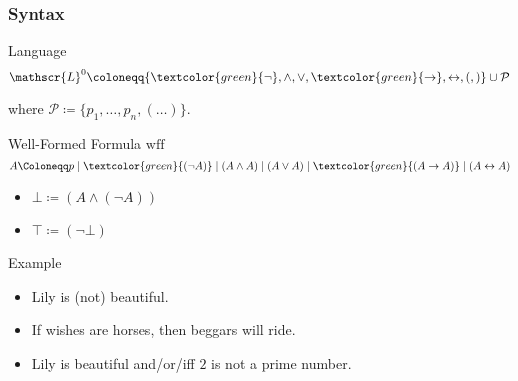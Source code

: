 \documentclass[UTF8,11pt,colorlinks,compress,openany]{beamer}%
\begin{document}
\begin{frame}\frametitle{Syntax}
		\begin{block}{Language}
			\[\mathscr{L}^0\coloneqq \{\textcolor{green}{\neg},\wedge,\vee,\textcolor{green}{\to},\leftrightarrow,(,)\}\cup\mathcal{P}\]
		\end{block}
		where $\mathcal{P}\coloneqq \{p_1,\dots,p_n,(\dots)\}$.
		\begin{block}{Well-Formed Formula $\mathrm{wff}$}
			\[A\Coloneqq p\mid \textcolor{green}{(\neg A)}\mid (A\wedge A)\mid (A\vee A)\mid \textcolor{green}{(A\to A)}\mid (A\leftrightarrow A)\]
		\end{block}
		\begin{itemize}
			\item $\bot\coloneqq (A\wedge(\neg A))$
			\item $\top\coloneqq (\neg\bot)$
		\end{itemize}
		\begin{block}{Example}
			\begin{itemize}
				\item Lily is (not) beautiful.
				\item If wishes are horses, then beggars will ride.
				\item Lily is beautiful and/or/iff $2$ is not a prime number.
			\end{itemize}
		\end{block}
\end{frame}
\end{document}

